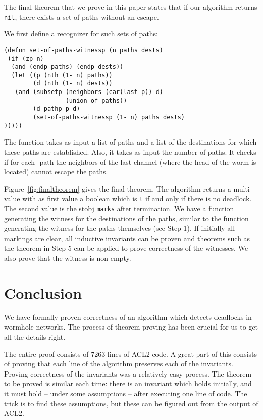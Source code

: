 \documentclass[submission,copyright]{eptcs}
\begin{document}
The final theorem that we prove in this paper states that if our algorithm returns {\tt nil}, there exists a set of paths without an escape.

We first define a recognizer for such sets of paths:
\begin{verbatim}
(defun set-of-paths-witnessp (n paths dests)
 (if (zp n)
  (and (endp paths) (endp dests))
  (let ((p (nth (1- n) paths))
        (d (nth (1- n) dests))
   (and (subsetp (neighbors (car(last p)) d)
                 (union-of paths))
        (d-pathp p d)
        (set-of-paths-witnessp (1- n) paths dests)
)))))
\end{verbatim}
The function takes as input a list of paths and a list of the destinations for which these paths are established. Also, it takes as input the number of paths. It checks if for each -path  the neighbors of the last channel (where the head of the worm is located) cannot escape the paths.

Figure~\ref{fig:finaltheorem} gives the final theorem.
The algorithm returns a multi value with as first value a boolean  which is {\tt t} if and only if there is no deadlock. The second value is the stobj {\tt marks} after termination. We have a function generating the witness for the destinations of the paths, similar to the function generating the witness for the paths themselves (see Step 1). If initially all markings are clear, all inductive invariants can be proven and theorems such as the theorem in Step 5 can be applied to prove correctness of the witnesses.  We also prove that the witness is non-empty.

\section{Conclusion}\label{sec:conclusion}

We have formally proven correctness of an algorithm which detects deadlocks in wormhole networks.
The process of theorem proving has been crucial for us to get all the details right.

The entire proof consists of 7263 lines of ACL2 code. A great part of this consists of proving that each line of the algorithm preserves each of the invariants.
Proving correctness of the invariants was a relatively easy process.
The theorem to be proved is similar each time: there is an invariant which holds initially, and it must hold -- under some assumptions -- after executing one line of code.
The trick is to find these assumptions, but these can be figured out from the output of ACL2.
\end{document}
